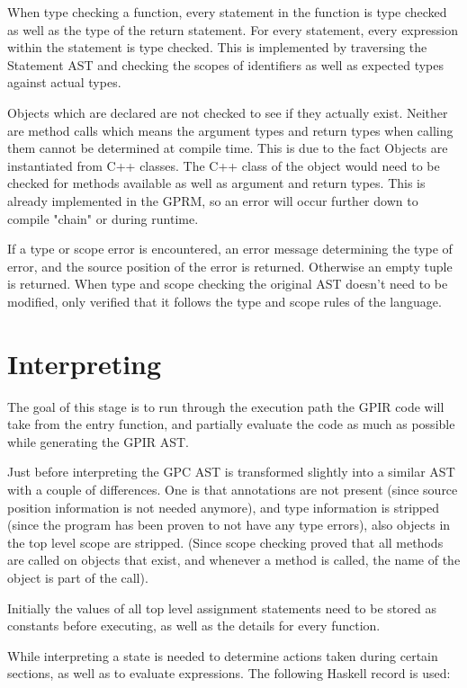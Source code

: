 When type checking a function, every statement in the function is type checked
as well as the type of the return statement. For every statement,
every expression within the statement is type checked. This is implemented by traversing
the Statement AST and checking the scopes of identifiers as well as expected types
against actual types.

Objects which are declared are not checked to see if they actually exist. Neither
are method calls which means the argument types and return types when calling them
cannot be determined at compile time. This is due to the fact Objects are instantiated from
C++ classes. The C++ class of the object would need to be checked for 
methods available as well as argument and return types. 
This is already implemented in the GPRM, so an error will occur further down to compile "chain" or during
runtime.

If a type or scope error is encountered, an error message determining the type of error,
and the source position of the error is returned. Otherwise an empty tuple is returned.
When type and scope checking the original AST doesn't need to be modified, only verified
that it follows the type and scope rules of the language.


\section{Interpreting}

The goal of this stage is to run through the execution path the GPIR code
will take from the entry function, and partially evaluate the code as much
as possible while generating the GPIR AST.

Just before interpreting the GPC AST is transformed slightly into a similar AST
with a couple of differences. One is that annotations are not present (since source position information
is not needed anymore), and type information is stripped (since the program has been proven to 
not have any type errors), also objects in the top level scope are stripped. (Since scope checking
proved that all methods are called on objects that exist, and whenever a method is called, the
name of the object is part of the call).

Initially the values of all top level assignment statements need to be stored
as constants before executing, as well as the details for every function.

While interpreting a state is needed to determine actions taken
during certain sections, as well as to evaluate expressions.
The following Haskell record is used:

